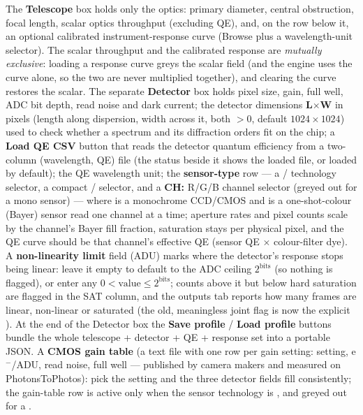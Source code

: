 The \textbf{Telescope} box holds only the optics: primary diameter, central
obstruction, focal length, scalar optics throughput (excluding QE), and,
on the row below it, an optional calibrated instrument-response curve
(\textsf{Browse} plus a wavelength-unit selector). The scalar throughput
and the calibrated response are \emph{mutually exclusive}: loading a
response curve greys the scalar field (and the engine uses the curve
alone, so the two are never multiplied together), and clearing the curve
restores the scalar. The
separate \textbf{Detector} box holds pixel size, gain, full well, ADC bit
depth, read noise and dark current; the detector dimensions
\textbf{L$\times$W} in pixels (length along dispersion, width across it,
both $>0$, default $1024\times1024$) used to check whether a spectrum and
its diffraction orders fit on the chip; a \textbf{Load QE CSV} button that reads
the detector quantum efficiency from a two-column (wavelength, QE) file (the
status beside it shows the loaded file, or  loaded by default);
the QE wavelength unit; the \textbf{sensor-type} row --- a
/ technology selector, a compact /
selector, and a \textbf{CH:} R/G/B channel selector (greyed out for a mono
sensor) --- where  is a monochrome CCD/CMOS and  is a
one-shot-colour (Bayer) sensor read one channel at a time; aperture rates
and pixel counts scale by the channel's Bayer fill fraction, saturation
stays per physical pixel, and the QE curve should be that channel's
effective QE (sensor QE $\times$ colour-filter dye). A
\textbf{non-linearity limit} field (ADU) marks where the detector's
response stops being linear: leave it empty to default to the ADC ceiling
$2^{\text{bits}}$ (so nothing is flagged), or enter any
$0 < \text{value} \le 2^{\text{bits}}$; counts above it but below hard
saturation are flagged  in the SAT column, and the outputs
tab reports how many frames are linear, non-linear or saturated (the old,
meaningless  joint flag is now the explicit ). At
the end of
the Detector box the \textbf{Save profile} / \textbf{Load profile} buttons
bundle the whole telescope + detector + QE + response set into a portable
JSON. A \textbf{CMOS gain table} (a text file with one row per gain
setting: setting, e$^-$/ADU, read noise, full well — published by camera
makers and measured on PhotonsToPhotos): pick the setting and the three
detector fields fill consistently; the gain-table row is active only when
the sensor technology is , and greyed out for a .
